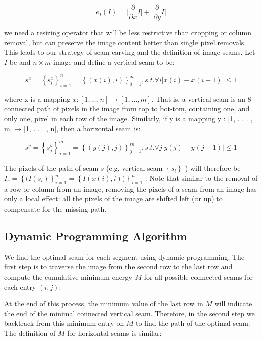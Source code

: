 \documentclass[conference]{acmsiggraph}
\begin{document}
\begin{equation}
e_I(I)=   \lvert \frac{\partial}{\partial x} I \rvert + \lvert  \frac{\partial}{\partial y} I 
\rvert 
\end{equation}

we need a resizing operator that will be less restrictive than cropping or column removal, but can preserve the image content better than single pixel removals. This leads to our strategy of seam carving and the definition of image seams. Let $I$ be and $n \times m $ image and define a vertical seam to be:

\begin{equation}
s^{x} = { \left\{ s_{i}^{x} \right\}  }_{i=1}^{n} = 
{\left\{ (x(i),i) \right\}}_{i=1}^{n} ,s.t. \forall i \lvert x(i) - x(i - 1)  \rvert \leq 1  
\end{equation}

where x is a mapping $x : [1, . . . , n] \longrightarrow [1, . . . , m]$. That is, a vertical seam is an 8-connected path of pixels in the image from top to bot-tom, containing one, and only one, pixel in each row of the image. Similarly, if y is a mapping y : [1, . . . , m] → [1, . . . , n], then a horizontal seam is:

\begin{equation}
s^{y} = { \left\{ s_{j}^{y} \right\}  }_{j=1}^{m} = 
{\left\{ (y(j),j) \right\} }_{j=1}^{m} ,s.t. \forall j \lvert y(j) - y(j - 1)  \rvert \leq 1
\end{equation} 


The pixels of the path of seam $s$ (e.g. vertical seam $\left\{ s_{i} \right\}$ ) will therefore be $I_s = {\left\{ (I(s_i) \right\} }_{i=1}^{n} = {\left\{ I (x(i),i)) \right\}}_{i=1}^{n} $  . Note that similar to the removal of a row or column from an image, removing the pixels of a seam from an image has only a local effect: all the pixels of the image are shifted left (or up) to compensate for the missing path.


\subsection{Dynamic Programming Algorithm}
We find the optimal seam for each segment using dynamic programming. The first step is to traverse the image from the second row to the last row and compute the cumulative minimum energy $M$ for all possible connected seams for each entry $(i, j)$:

At the end of this process, the minimum value of the last row in $M$ will indicate the end of the minimal connected vertical seam. Therefore, in the second step we backtrack from this minimum entry on $M$ to find the path of the optimal seam. The definition of $M$ for horizontal seams is similar:
\end{document}
